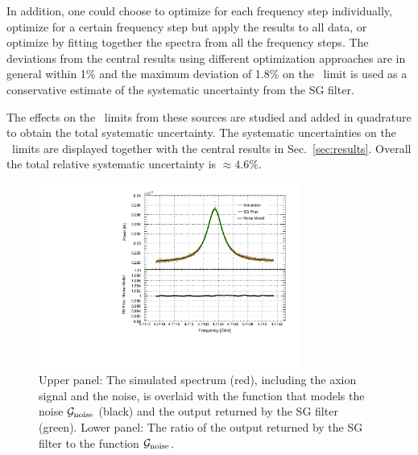 \begin{itemize}
In addition, one could choose to optimize for each frequency step 
individually, optimize for a certain frequency step but apply the results to 
all data, or optimize by fitting together the spectra from all the frequency 
steps. %
The deviations from the central results using different optimization 
approaches are in general within 1\% and the 
maximum deviation of 1.8\% 
on the \gagg\ limit is used as a conservative estimate of the systematic 
uncertainty from the SG filter. 

\end{itemize}

The effects on the \gagg\ limits from these sources are studied and added in 
quadrature to obtain the total systematic uncertainty. 
The systematic uncertainties on the \gagg\ limits 
are displayed together with the central results in Sec.~\ref{sec:results}. 
Overall the total relative systematic uncertainty is $\approx 4.6\%$.

\begin{figure} [htbp]
  \centering
  \includegraphics[width=8.6cm]{figures/GeneratedSpectrum_Optimized_SGFilter_NPar_3_Window_141.pdf}
  \caption{Upper panel: 
 The simulated spectrum (red), including the axion signal and the 
noise, is overlaid with the function that models the noise 
${\cal G}_\text{noise}$ (black) and the 
output returned by the SG filter (green). Lower panel: The ratio of the output 
returned by the SG filter to the function ${\cal G}_\text{noise}$.}
  \label{fig:sgcompare}
\end{figure}



